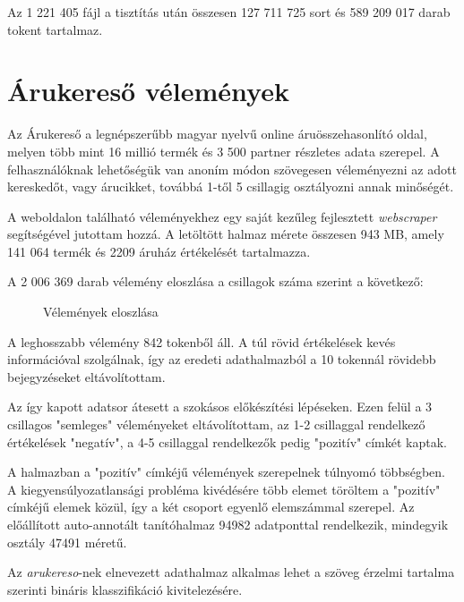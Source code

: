 Az 1 221 405 fájl a tisztítás után összesen 127 711 725 sort és 589 209 017 darab tokent tartalmaz.

\section{Árukereső vélemények}
Az Árukereső \cite{arukereso} a legnépszerűbb magyar nyelvű online áruösszehasonlító oldal, melyen több mint 16 millió termék és 3 500 partner részletes adata szerepel. A felhasználóknak lehetőségük van anoním módon szövegesen véleményezni az adott kereskedőt, vagy árucikket, továbbá 1-től 5 csillagig osztályozni annak minőségét.

A weboldalon található véleményekhez egy saját kezűleg fejlesztett \textit{webscraper} segítségével jutottam hozzá. A letöltött halmaz mérete összesen 943 MB, amely 141 064 termék és 2209 áruház értékelését tartalmazza. 

A 2 006 369 darab vélemény eloszlása a csillagok száma szerint a következő:

\begin{figure}[H]
	\centering
	\hspace{5pt}
	\caption{Vélemények eloszlása}
	\label{fig:arukereso}
\end{figure}

A leghosszabb vélemény 842 tokenből áll. A túl rövid értékelések kevés információval szolgálnak, így az eredeti adathalmazból a 10 tokennál rövidebb bejegyzéseket eltávolítottam.

Az így kapott adatsor átesett a szokásos előkészítési lépéseken. Ezen felül a 3 csillagos "semleges" véleményeket eltávolítottam, az 1-2 csillaggal rendelkező értékelések "negatív", a 4-5 csillaggal rendelkezők pedig "pozitív" címkét kaptak.

A halmazban a "pozitív" címkéjű vélemények szerepelnek túlnyomó többségben. A kiegyensúlyozatlansági probléma kivédésére több elemet töröltem a "pozitív" címkéjű elemek közül, így a két csoport egyenlő elemszámmal szerepel. Az előállított auto-annotált tanítóhalmaz 94982 adatponttal rendelkezik, mindegyik osztály 47491 méretű. 

Az \textit{arukereso}-nek elnevezett adathalmaz alkalmas lehet a szöveg érzelmi tartalma szerinti bináris klasszifikáció kivitelezésére. 
